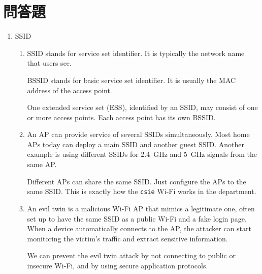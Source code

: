 \documentclass[12pt, a4paper]{article}
\begin{document}
  \section{問答題}
  \begin{enumerate}[label=(\alph*)]
    \item SSID
    \begin{enumerate}[label=(\arabic*)]
      \item SSID stands for service set identifier. It is typically the network name that
      users see.

      BSSID stands for basic service set identifier. It is usually the MAC address of the
      access point.

      One extended service set (ESS), identified by an SSID, may consist of one or
      more access points. Each access point has its own BSSID.

      \item An AP can provide service of several SSIDs simultaneously. Most home APs today
      can deploy a main SSID and another guest SSID. Another example is using different SSIDs
      for 2.4~GHz and 5~GHz signals from the same AP.

      Different APs can share the same SSID. Just configure the APs to the same SSID. This is
      exactly how the \verb|csie| Wi-Fi works in the department.

      \item An evil twin is a malicious Wi-Fi AP that mimics a legitimate one, often
      set up to have the same SSID as a public Wi-Fi and a fake login page. When a device
      automatically connects to the AP, the attacker can start monitoring the victim's
      traffic and extract sensitive information.

      We can prevent the evil twin attack by not connecting to public or insecure
      Wi-Fi, and by using secure application protocols.


\end{enumerate}
\end{enumerate}
\end{document}

